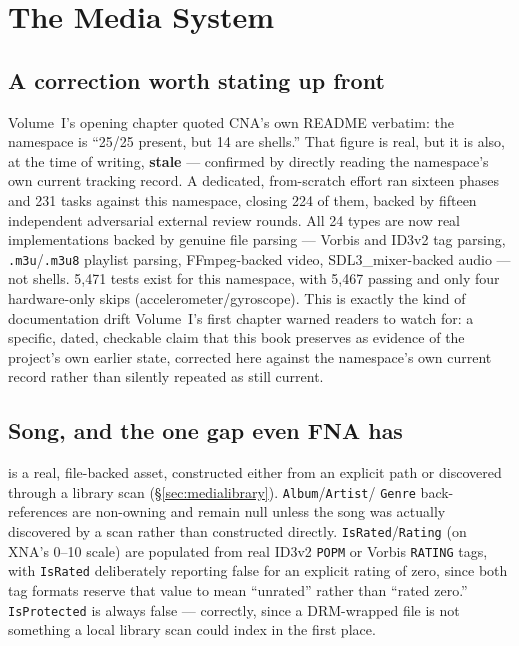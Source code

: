 \chapter{The Media System}
\label{ch:media-system}

\section{A correction worth stating up front}

Volume~I's opening chapter quoted CNA's own README verbatim: the  namespace is
``25/25 present, but 14 are shells.'' That figure is real, but it is also, at the time of
writing, \textbf{stale} --- confirmed by directly reading the namespace's own current
tracking record. A dedicated, from-scratch effort ran sixteen phases and 231 tasks against
this namespace, closing 224 of them, backed by fifteen independent adversarial external
review rounds. All 24  types are now real implementations backed by genuine file
parsing --- Vorbis and ID3v2 tag parsing, \texttt{.m3u}/\texttt{.m3u8} playlist parsing,
FFmpeg-backed video, SDL3\_mixer-backed audio --- not shells. 5{,}471 tests exist for this
namespace, with 5{,}467 passing and only four hardware-only skips (accelerometer/gyroscope).
This is exactly the kind of documentation drift Volume~I's first chapter warned readers to
watch for: a specific, dated, checkable claim that this book preserves as evidence of the
project's own earlier state, corrected here against the namespace's own current record rather
than silently repeated as still current.

\section{Song, and the one gap even FNA has}

 is a real, file-backed asset, constructed either from an explicit path or
discovered through a library scan (\S\ref{sec:medialibrary}). \texttt{Album}/\texttt{Artist}/%
\texttt{Genre} back-references are non-owning and remain null unless the song was actually
discovered by a scan rather than constructed directly. \texttt{IsRated}/\texttt{Rating}
(on XNA's 0--10 scale) are populated from real ID3v2 \texttt{POPM} or Vorbis \texttt{RATING}
tags, with \texttt{IsRated} deliberately reporting false for an explicit rating of zero,
since both tag formats reserve that value to mean ``unrated'' rather than ``rated zero.''
\texttt{IsProtected} is always false --- correctly, since a DRM-wrapped file is not something
a local library scan could index in the first place.

